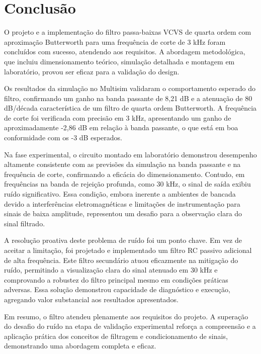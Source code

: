 \section{Conclusão}

O projeto e a implementação do filtro passa-baixas VCVS de quarta ordem com aproximação Butterworth para uma frequência de corte de 3 kHz foram concluídos com sucesso, atendendo aos requisitos. A abordagem metodológica, que incluiu dimensionamento teórico, simulação detalhada e montagem em laboratório, provou ser eficaz para a validação do design.

Os resultados da simulação no Multisim\textregistered{} validaram o comportamento esperado do filtro, confirmando um ganho na banda passante de 8,21 dB e a atenuação de 80 dB/década característica de um filtro de quarta ordem Butterworth. A frequência de corte foi verificada com precisão em 3 kHz, apresentando um ganho de aproximadamente -2,86 dB em relação à banda passante, o que está em boa conformidade com os -3 dB esperados.

Na fase experimental, o circuito montado em laboratório demonstrou desempenho altamente consistente com as previsões da simulação na banda passante e na frequência de corte, confirmando a eficácia do dimensionamento. Contudo, em frequências na banda de rejeição profunda, como 30 kHz, o sinal de saída exibiu ruído significativo. Essa condição, embora inerente a ambientes de bancada devido a interferências eletromagnéticas e limitações de instrumentação para sinais de baixa amplitude, representou um desafio para a observação clara do sinal filtrado.

A resolução proativa deste problema de ruído foi um ponto chave. Em vez de aceitar a limitação, foi projetado e implementado um filtro RC passivo adicional de alta frequência. Este filtro secundário atuou eficazmente na mitigação do ruído, permitindo a visualização clara do sinal atenuado em 30 kHz e comprovando a robustez do filtro principal mesmo em condições práticas adversas. Essa solução demonstrou capacidade de diagnóstico e execução, agregando valor substancial aos resultados apresentados.

Em resumo, o filtro atendeu plenamente aos requisitos do projeto. A superação do desafio do ruído na etapa de validação experimental reforça a compreensão e a aplicação prática dos conceitos de filtragem e condicionamento de sinais, demonstrando uma abordagem completa e eficaz.

\nocite{boylestad, malvino}
